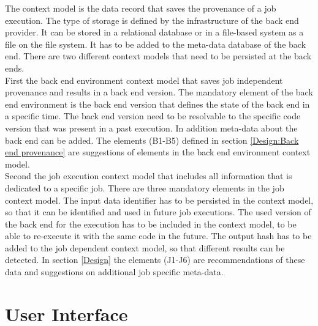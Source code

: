 \documentclass[draft,final]{vutinfth} %
\begin{document}
The context model is the data record that saves the provenance of a job execution. The type of storage is defined by the infrastructure of the back end provider. It can be stored in a relational database or in a file-based system as a file on the file system. It has to be added to the meta-data database of the back end. There are two different context models that need to be persisted at the back ends. \\
First the back end environment context model that saves job independent provenance and results in a back end version. The mandatory element of the back end environment is the back end version that defines the state of the back end in a specific time. The back end version need to be resolvable to the specific code version that was present in a past execution. In addition meta-data about the back end can be added. The elements (B1-B5) defined in section \ref{Design:Back end provenance} are suggestions of elements in the back end environment context model.\\
Second the job execution context model that includes all information that is dedicated to a specific job. There are three mandatory elements in the job context model. The input data identifier has to be persisted in the context model, so that it can be identified and used in future job executions. The used version of the back end for the execution has to be included in the context model, to be able to re-execute it with the same code in the future. The output hash has to be added to the job dependent context model, so that different results can be detected. In section \ref{Design} the elements (J1-J6) are recommendations of these data and suggestions on additional job specific meta-data.  



\section{User Interface}\label{Design:User Interface}
\end{document}
